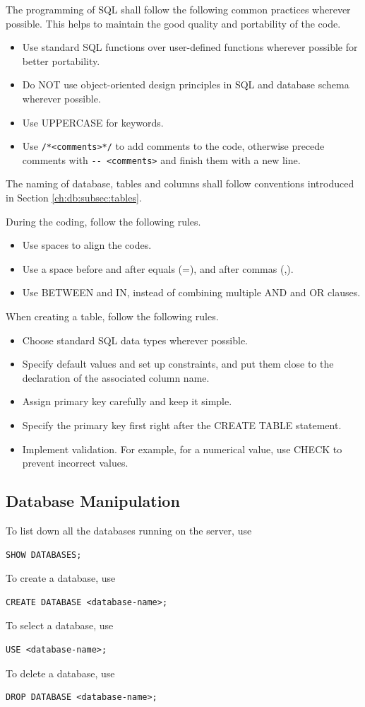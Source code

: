 The programming of SQL shall follow the following common practices wherever possible. This helps to maintain the good quality and portability of the code.
\begin{itemize}
	\item Use standard SQL functions over user-defined functions wherever possible for better portability.
	\item Do NOT use object-oriented design principles in SQL and database schema wherever possible.
	\item Use UPPERCASE for keywords.
	\item Use \verb|/*<comments>*/| to add comments to the code, otherwise precede comments with \verb|-- <comments>| and finish them with a new line.
\end{itemize}

The naming of database, tables and columns shall follow conventions introduced in Section \ref{ch:db:subsec:tables}.

During the coding, follow the following rules.
\begin{itemize}
	\item Use spaces to align the codes.
	\item Use a space before and after equals (=), and after commas (,).
	\item Use BETWEEN and IN, instead of combining multiple AND and OR clauses.
\end{itemize}

When creating a table, follow the following rules.
\begin{itemize}
	\item Choose standard SQL data types wherever possible.
	\item Specify default values and set up constraints, and put them close to the declaration of the associated column name.
	\item Assign primary key carefully and keep it simple.
	\item Specify the primary key first right after the CREATE TABLE statement.
	\item Implement validation. For example, for a numerical value, use CHECK to prevent incorrect values.
\end{itemize}

\subsection{Database Manipulation}

To list down all the databases running on the server, use
\begin{lstlisting}
SHOW DATABASES;
\end{lstlisting}
To create a database, use
\begin{lstlisting}
CREATE DATABASE <database-name>;
\end{lstlisting}
To select a database, use
\begin{lstlisting}
USE <database-name>;
\end{lstlisting}
To delete a database, use
\begin{lstlisting}
DROP DATABASE <database-name>;
\end{lstlisting}

